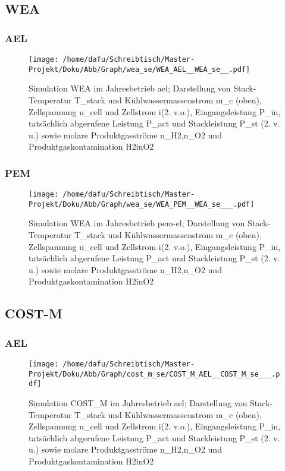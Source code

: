 \documentclass[onecolumn,10pt,titlepage]{article}
\begin{document}
\subsection{WEA}
\subsubsection{AEL}
\begin{figure}[H]
	\centering
	\texttt{[image: /home/dafu/Schreibtisch/Master-Projekt/Doku/Abb/Graph/wea\_se/WEA\_AEL\_\_WEA\_se\_\_.pdf]}
	
	\caption[Simulation WEA im Jahresbetrieb \gls{ael}]{Simulation WEA im Jahresbetrieb \gls{ael}; Darstellung von Stack-Temperatur \gls{T_stack} und Kühlwassermassenstrom \gls{m_c} (oben), Zellspannung \gls{u_cell} und Zellstrom \gls{i}(2. v.o.), Eingangsleistung \gls{P_in},  tatsächlich abgerufene Leistung \gls{P_act} und Stackleistung \gls{P_st} (2. v. u.) sowie molare Produktgasströme \gls{n_H2},\gls{n_O2} und Produktgaskontamination \gls{H2inO2}}
	\label{fig:plt_se_WEA_AEL} 
\end{figure}
\subsubsection{PEM}
\begin{figure}
	\centering
	\texttt{[image: /home/dafu/Schreibtisch/Master-Projekt/Doku/Abb/Graph/wea\_se/WEA\_PEM\_\_WEA\_se\_\_\_.pdf]}
	
	\caption[Simulation WEA im Jahresbetrieb \gls{pem}-\gls{el}]{Simulation WEA im Jahresbetrieb \gls{pem}-\gls{el}; Darstellung von Stack-Temperatur \gls{T_stack} und Kühlwassermassenstrom \gls{m_c} (oben), Zellspannung \gls{u_cell} und Zellstrom \gls{i}(2. v.o.), Eingangsleistung \gls{P_in},  tatsächlich abgerufene Leistung \gls{P_act} und Stackleistung \gls{P_st} (2. v. u.) sowie molare Produktgasströme \gls{n_H2},\gls{n_O2} und Produktgaskontamination \gls{H2inO2}}
	\label{fig:plt_se_WEA_PEM} 
\end{figure}
\subsection{COST-M}
\subsubsection{AEL}
\begin{figure}
	\centering
	\texttt{[image: /home/dafu/Schreibtisch/Master-Projekt/Doku/Abb/Graph/cost\_m\_se/COST\_M\_AEL\_\_COST\_M\_se\_\_\_.pdf]}
	
	\caption[Simulation COST\_M im Jahresbetrieb \gls{ael}]{Simulation COST\_M im Jahresbetrieb \gls{ael}; Darstellung von Stack-Temperatur \gls{T_stack} und Kühlwassermassenstrom \gls{m_c} (oben), Zellspannung \gls{u_cell} und Zellstrom \gls{i}(2. v.o.), Eingangsleistung \gls{P_in},  tatsächlich abgerufene Leistung \gls{P_act} und Stackleistung \gls{P_st} (2. v. u.) sowie molare Produktgasströme \gls{n_H2},\gls{n_O2} und Produktgaskontamination \gls{H2inO2}}
	\label{fig:plt_se_COST_ALE} 
\end{figure}
\end{document}

